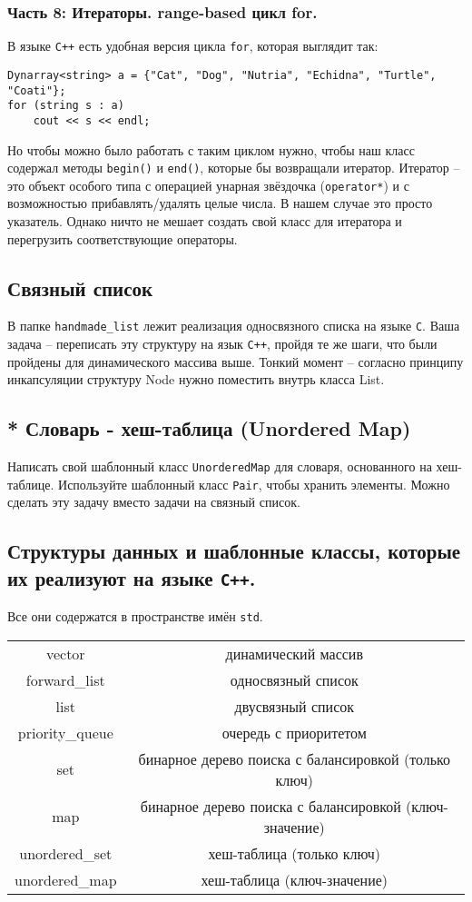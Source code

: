 \documentclass{article}
\begin{document}
\subsubsection*{Часть 8: Итераторы. range-based цикл for.}
В языке \texttt{C++} есть удобная версия цикла \texttt{for}, которая выглядит так:
\begin{lstlisting}
Dynarray<string> a = {"Cat", "Dog", "Nutria", "Echidna", "Turtle", "Coati"};
for (string s : a)
	cout << s << endl;
\end{lstlisting}
Но чтобы можно было работать с таким циклом нужно, чтобы наш класс содержал методы \texttt{begin()} и \texttt{end()}, которые бы возвращали итератор. Итератор -- это объект особого типа с операцией унарная звёздочка (\texttt{operator*}) и с возможностью прибавлять/удалять целые числа. В нашем случае это просто указатель. Однако ничто не мешает создать свой класс для итератора и перегрузить соответствующие операторы.

\subsection*{Связный список}
В папке \texttt{handmade\_list} лежит реализация односвязного списка на языке \texttt{C}. Ваша задача -- переписать эту структуру на язык \texttt{C++}, пройдя те же шаги, что были пройдены для динамического массива выше. Тонкий момент -- согласно принципу инкапсуляции структуру Node нужно поместить внутрь класса List.\\

\subsection*{* Словарь - хеш-таблица (Unordered Map)}
Написать свой шаблонный класс \texttt{UnorderedMap} для словаря, основанного на хеш-таблице. Используйте шаблонный класс \texttt{Pair}, чтобы хранить элементы.
Можно сделать эту задачу вместо задачи на связный список. \\

\newpage
\subsection*{Структуры данных и шаблонные классы, которые их реализуют на языке \texttt{C++}.}
Все они содержатся в пространстве имён \texttt{std}.
\begin{center}
\begin{tabular}{ c | c }
  \hline			
  vector & динамический массив \\
  forward\_list & односвязный список \\
  list & двусвязный список \\
  priority\_queue & очередь с приоритетом\\
  set & бинарное дерево поиска с балансировкой (только ключ) \\
  map & бинарное дерево поиска с балансировкой (ключ-значение)\\
  unordered\_set & хеш-таблица (только ключ) \\
  unordered\_map & хеш-таблица (ключ-значение)\\
  \hline  
\end{tabular}
\end{center}
\end{document}
